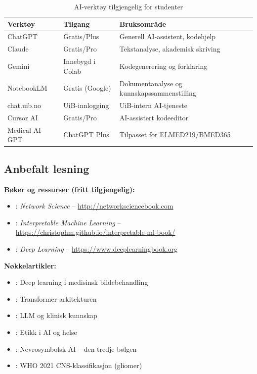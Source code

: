 \documentclass[11pt,a4paper]{article}
\begin{document}
\begin{table}[htbp]
\centering
\caption{AI-verktøy tilgjengelig for studenter}
\label{tab:aitools}
\begin{tabular}{@{}llp{6cm}@{}}
\toprule
\textbf{Verktøy} & \textbf{Tilgang} & \textbf{Bruksområde} \\
\midrule
ChatGPT & Gratis/Plus & Generell AI-assistent, kodehjelp \\
Claude & Gratis/Pro & Tekstanalyse, akademisk skriving \\
Gemini & Innebygd i Colab & Kodegenerering og forklaring \\
NotebookLM & Gratis (Google) & Dokumentanalyse og kunnskapssammenstilling \\
chat.uib.no & UiB-innlogging & UiB-intern AI-tjeneste \\
Cursor AI & Gratis/Pro & AI-assistert kodeeditor \\
Medical AI GPT & ChatGPT Plus & Tilpasset for ELMED219/BMED365 \\
\bottomrule
\end{tabular}
\end{table}

\subsection{Anbefalt lesning}

\textbf{Bøker og ressurser (fritt tilgjengelig):}
\begin{itemize}[nosep]
    \item \citet{barabasi2016network}: \emph{Network Science} -- \url{http://networksciencebook.com}
    \item \citet{molnar2022interpretable}: \emph{Interpretable Machine Learning} -- \url{https://christophm.github.io/interpretable-ml-book/}
    \item \citet{goodfellow2016deep}: \emph{Deep Learning} -- \url{https://www.deeplearningbook.org}
\end{itemize}

\textbf{Nøkkelartikler:}
\begin{itemize}[nosep]
    \item \citet{lundervold2019overview}: Deep learning i medisinsk bildebehandling
    \item \citet{vaswani2017attention}: Transformer-arkitekturen
    \item \citet{singhal2023large}: LLM og klinisk kunnskap
    \item \citet{morley2020ethics}: Etikk i AI og helse
    \item \citet{garcez2020neurosymbolic}: Nevrosymbolsk AI -- den tredje bølgen
    \item \citet{louis2021who}: WHO 2021 CNS-klassifikasjon (gliomer)
\end{itemize}
\end{document}
